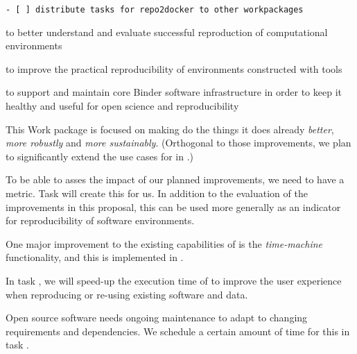 \begin{draft}
\begin{verbatim}
- [ ] distribute tasks for repo2docker to other workpackages
\end{verbatim}
\end{draft}

\begin{workpackage}[
  id=reproducibility,
  wphases=0-36!1.03,
  title=Improving robustness of reproducibility tools,
  short=Robustness,
  lead=QS,
  SRLRM=23,
  UIORM=0,
  MPRM=2,
  QSRM=12,
  swsites,
]
\begin{wpobjectives}
  \begin{compactitem}
    \item to better understand and evaluate successful reproduction of computational environments
    \item to improve the practical reproducibility of environments constructed
      with \TheProject tools
    \item to support and maintain core Binder software infrastructure in order to keep it healthy
         and useful for open science and reproducibility
 \end{compactitem}
\end{wpobjectives}

\begin{wpdescription}

This Work package is focused on making \repotodocker{} do the things it does
already \emph{better}, \emph{more robustly} and \emph{more sustainably}.
(Orthogonal to those improvements, we plan to significantly extend the use cases
for \repotodocker{} in .)

To be able to asses the impact of our planned improvements, we need to have a
metric. Task  will create this
for us. In addition to the evaluation of the improvements in this proposal, this
can be used more generally as an indicator for reproducibility of software
environments.

One major improvement to the existing capabilities of \repotodocker is the
\emph{time-machine} functionality, and this is implemented in .

In task , we will speed-up the execution time of
\repotodocker{} to improve the user experience when reproducing or re-using
existing software and data.

Open source software needs ongoing maintenance to adapt to changing requirements
and dependencies. We schedule a certain amount of time for this in task
.


\end{wpdescription}
\end{workpackage}
